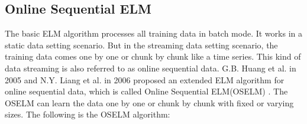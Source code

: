 \documentclass[a4paper, 14pt]{extarticle}
\begin{document}
\subsection{Online Sequential ELM}
\par The basic ELM algorithm processes all training data in batch mode. It works in a static data setting scenario. But in the streaming data setting scenario, the training data comes one by one or chunk by chunk like a time series. This kind of data streaming is also referred to as online sequential data. G.B. Huang et al. in 2005 and N.Y. Liang et al. in 2006 proposed an extended ELM algorithm for online sequential data, which is called Online Sequential ELM(OSELM)
\cite{huang2005line}\cite{liang2006fast}. The OSELM can learn the data one by one or chunk by chunk with fixed or varying sizes\cite{huang2015trends}. The following is the OSELM algorithm:\cite{huang2015trends}\cite{liang2006fast}
\newline \par
\end{document}
